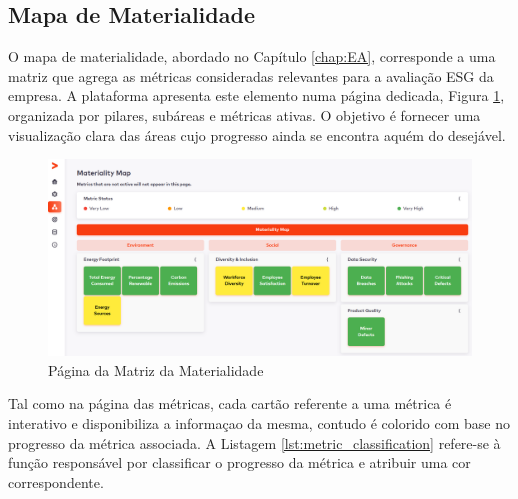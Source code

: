 \subsection{Mapa de Materialidade}

O mapa de materialidade, abordado no Capítulo \ref{chap:EA}, corresponde a uma matriz que agrega as métricas consideradas relevantes para a avaliação ESG da empresa. A plataforma apresenta este elemento numa página dedicada, Figura \ref{fig:matrix_done}, organizada por pilares, subáreas e métricas ativas. O objetivo é fornecer uma visualização clara das áreas cujo progresso ainda se encontra aquém do desejável.

\begin{figure}[H]
    \centering
    \includegraphics[width=\linewidth,keepaspectratio]{frontmatter/assets/platform_prints/matrix/matrix_done.png}
    \caption{Página da Matriz da Materialidade}
    \label{fig:matrix_done}
\end{figure}

Tal como na página das métricas, cada cartão referente a uma métrica é interativo e disponibiliza a informaçao da mesma, contudo é colorido com base no progresso da métrica associada. A Listagem \ref{lst:metric_classification} refere-se à função responsável por classificar o progresso da métrica e atribuir uma cor correspondente.

